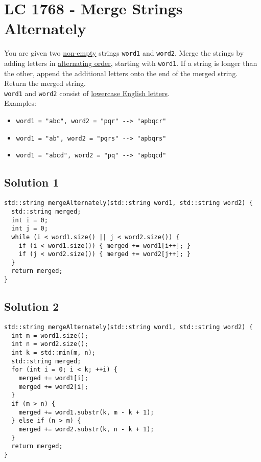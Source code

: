 {\section{LC 1768 - Merge Strings Alternately}\label{lc1768}
You are given two \ul{non-empty} strings {\colorbox{CodeBackground}{\lstinline|word1|}} and {\colorbox{CodeBackground}{\lstinline|word2|}}. Merge the strings by adding letters in \ul{alternating order}, starting with {\colorbox{CodeBackground}{\lstinline|word1|}}. If a string is longer than the other, append the additional letters onto the end of the merged string. Return the merged string.\\

{\colorbox{CodeBackground}{\lstinline|word1|}} and {\colorbox{CodeBackground}{\lstinline|word2|}} consist of \ul{lowercase English letters}.\\

Examples:
\begin{itemize}
\item {\colorbox{CodeBackground}{\lstinline|word1 = "abc", word2 = "pqr" --> "apbqcr"|}}
\item {\colorbox{CodeBackground}{\lstinline|word1 = "ab", word2 = "pqrs" --> "apbqrs"|}}
\item {\colorbox{CodeBackground}{\lstinline|word1 = "abcd", word2 = "pq" --> "apbqcd"|}}
\end{itemize}

\subsection*{Solution 1}
\begin{lstlisting}
std::string mergeAlternately(std::string word1, std::string word2) {
  std::string merged;
  int i = 0;
  int j = 0;
  while (i < word1.size() || j < word2.size()) {
    if (i < word1.size()) { merged += word1[i++]; }
    if (j < word2.size()) { merged += word2[j++]; }
  }
  return merged;
}
\end{lstlisting}

\subsection*{Solution 2}
\begin{lstlisting}
std::string mergeAlternately(std::string word1, std::string word2) {
  int m = word1.size();
  int n = word2.size();
  int k = std::min(m, n);
  std::string merged;
  for (int i = 0; i < k; ++i) {
    merged += word1[i];
    merged += word2[i];
  }
  if (m > n) {
    merged += word1.substr(k, m - k + 1);
  } else if (n > m) {
    merged += word2.substr(k, n - k + 1);
  }
  return merged;
}
\end{lstlisting}

}
